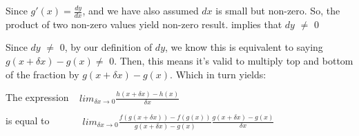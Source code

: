 \documentclass{article}
\begin{document}
Since $g'(x) = \frac{dy}{dx}$, and we have also assumed $dx$ is small but non-zero. So, the product of two non-zero values yield non-zero result.  implies that $dy$ $\neq$ $0$

Since $dy$ $\neq$ $0$, by our definition of $dy$, we know this is equivalent to saying  ${g(x+δx)−g(x)}$$\neq$ $0$. Then, this means it's valid to multiply top and bottom of the fraction by ${g(x+δx)−g(x)}$. Which in turn yields:
 
The expression$\ \ \ \ \ lim_{δx→0} \frac{h(x+δx)−h(x)}{δx}\ \ \ \ \ $      

is equal to $\ \ \ \ \ \ \ \ \ \ \ \ \ \ lim_{δx→0}\frac{f(g(x+δx))−f(g(x))}{g(x+δx)−g(x)}\frac{g(x+δx)−g(x)}{δx}$		
\end{document}
